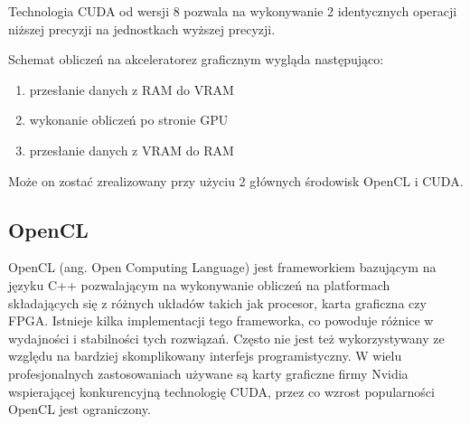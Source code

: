 Technologia CUDA od wersji 8 pozwala na wykonywanie 2 identycznych operacji niższej precyzji na jednostkach wyższej precyzji. \cite{Mix16}

Schemat obliczeń na akceleratorez graficznym wygląda następująco:
\begin{enumerate}
	\item przesłanie danych z RAM do VRAM
	\item wykonanie obliczeń po stronie GPU
	\item przesłanie danych z VRAM do RAM
\end{enumerate}

Może on zostać zrealizowany przy użyciu 2 głównych środowisk OpenCL i CUDA.

\subsection{OpenCL}
OpenCL (ang. Open Computing Language) jest frameworkiem bazującym na języku C++ pozwalającym na wykonywanie obliczeń na platformach składających się z różnych układów takich jak procesor, karta graficzna czy FPGA. Istnieje kilka implementacji tego frameworka, co powoduje różnice w wydajności i stabilności tych rozwiązań. Często nie jest też wykorzystywany ze względu na bardziej skomplikowany interfejs programistyczny. W wielu profesjonalnych zastosowaniach używane są karty graficzne firmy Nvidia wspierającej konkurencyjną technologię CUDA, przez co wzrost popularności OpenCL jest ograniczony.

































 